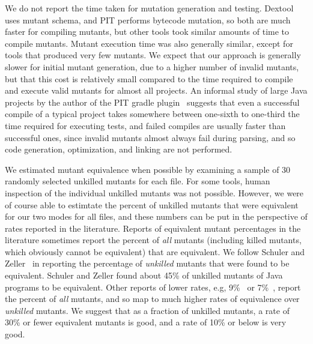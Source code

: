 \documentclass[acmsmall]{acmart}
\begin{document}
{We do not report the time taken for mutation generation and testing.
Dextool uses mutant schema, and PIT performs bytecode mutation, so
both are much faster for compiling mutants, but other tools took similar
amounts of time to compile mutants.   Mutant execution time was also
generally similar, except for tools that produced very few mutants.
We expect that our approach is generally slower for initial mutant
generation, due to a higher number of invalid mutants, but that this
cost is relatively small compared to the time required to compile and
execute valid mutants for almost all projects.  An informal study of
large Java projects by the author of the PIT gradle
plugin~\cite{mutantSlow}
  suggests that even a successful compile of a typical project takes
  somewhere between one-sixth to one-third the time required for
  executing tests, and failed compiles are usually faster than
  successful ones, since invalid mutants almost always fail during
  parsing, and so code generation, optimization, and linking are not performed.

We estimated mutant equivalence when possible by examining a sample of
30 randomly selected unkilled mutants for each file.  For some tools,
human inspection of the individual unkilled mutants was not possible.
However, we were of course able to estimtate the percent of unkilled
mutants that were equivalent for our two modes for all files, and
these numbers can be put in the perspective of rates reported in the
literature.  Reports of equivalent mutant percentages in the
literature sometimes report the percent of \emph{all} mutants
(including killed mutants, which obviously cannot be equivalent) that
are equivalent.  We follow Schuler and Zeller~\cite{EquivMut} in
reporting the percentage of \emph{unkilled} mutants that were found to
be equivalent.  Schuler and Zeller found about 45\% of unkilled
mutants of Java programs to be equivalent.  Other reports of lower
rates, e.g, 9\%~\cite{offutt1997automatically} or 7\%~\cite{TCE}, report the percent of
\emph{all} mutants, and so map to much higher rates of
equivalence over \emph{unkilled} mutants.  We suggest that as a
fraction of unkilled mutants, a rate of 30\% or fewer equivalent
mutants is good, and a rate of 10\% or below is very good.

}
\end{document}
